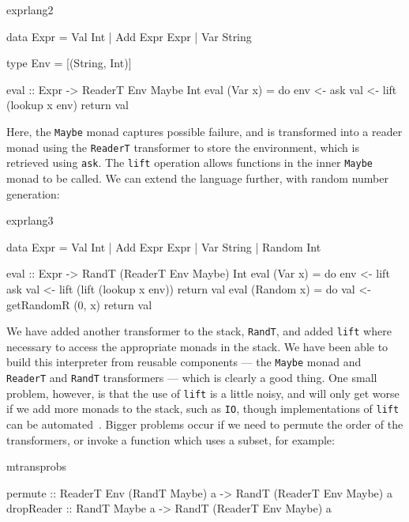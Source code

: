 \begin{SaveVerbatim}{exprlang2}

data Expr = Val Int | Add Expr Expr | Var String

type Env = [(String, Int)]

eval :: Expr -> ReaderT Env Maybe Int
eval (Var x) = do env <- ask
                  val <- lift (lookup x env)
                  return val

\end{SaveVerbatim}

\noindent
Here, the \texttt{Maybe} monad captures possible failure, and is transformed
into a reader monad using the \texttt{ReaderT} transformer to store the
environment, which is retrieved using \texttt{ask}. The \texttt{lift} operation
allows functions in the inner \texttt{Maybe} monad to be called.  
We can extend the language further, with random number generation:

\begin{SaveVerbatim}{exprlang3}

data Expr = Val Int | Add Expr Expr | Var String
          | Random Int

eval :: Expr -> RandT (ReaderT Env Maybe) Int
eval (Var x) = do env <- lift ask
                  val <- lift (lift (lookup x env))
                  return val
eval (Random x) = do val <- getRandomR (0, x)
                     return val

\end{SaveVerbatim}

\noindent
We have added another transformer to the stack, \texttt{RandT}, and added
\texttt{lift} where necessary to access the appropriate monads in the stack.
We have been able to build this interpreter from reusable components --- the
\texttt{Maybe} monad and \texttt{ReaderT} and \texttt{RandT} transformers ---
which is clearly a good thing. One small problem, however, is that the use of
\texttt{lift} is a little noisy, and will only get worse if we add more
monads to the stack, such as \texttt{IO}, though implementations of 
\texttt{lift} can be automated~\cite{Jaskelioff2009}.
Bigger problems occur if we need
to permute the order of the transformers, or invoke a function which uses a
subset, for example:

\begin{SaveVerbatim}{mtransprobs}

permute :: ReaderT Env (RandT Maybe) a -> 
           RandT (ReaderT Env Maybe) a
dropReader :: RandT Maybe a -> 
              RandT (ReaderT Env Maybe) a

\end{SaveVerbatim}

